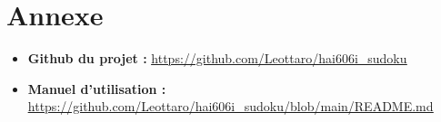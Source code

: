 \documentclass[a4paper]{article}
\begin{document}
\newpage
\section{Annexe}
\begin{itemize}
    \item \textbf{Github du projet :} \href{https://github.com/Leottaro/hai606i_sudoku}{\uline{\url{https://github.com/Leottaro/hai606i_sudoku}}}
    \item \textbf{Manuel d'utilisation :} \href{https://github.com/Leottaro/hai606i_sudoku/blob/main/README.md}{\uline{\url{https://github.com/Leottaro/hai606i_sudoku/blob/main/README.md}}}
\end{itemize}

\listoffigures
\end{document}
